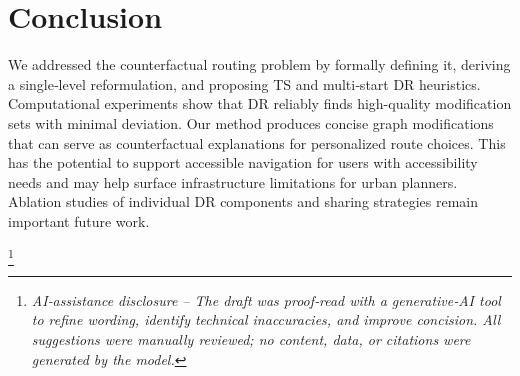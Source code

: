 \documentclass{article}
\newcommand{\blfootnote}[1]{
  \begingroup
  \renewcommand\thefootnote{}\footnote{#1}
  \addtocounter{footnote}{-1}
  \endgroup
}
\begin{document}
\section{Conclusion}
\label{sec:conclusion}
We addressed the counterfactual routing problem by formally defining it, deriving a single‑level reformulation, and proposing TS and multi‑start DR heuristics. Computational experiments show that DR reliably finds high-quality modification sets with minimal deviation. Our method produces concise graph modifications that can serve as counterfactual explanations for personalized route choices. This has the potential to support accessible navigation for users with accessibility needs and may help surface infrastructure limitations for urban planners. Ablation studies of individual DR components and sharing strategies remain important future work.




\blfootnote{\textit{AI‑assistance disclosure -- The draft was proof‑read with a generative‑AI tool to refine wording, identify technical inaccuracies, and improve concision. All suggestions were manually reviewed; no content, data, or citations were generated by the model.}}
\end{document}
